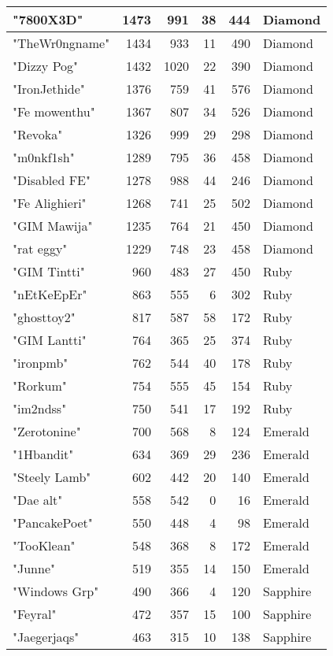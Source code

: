 \documentclass{article}
\begin{document}
\begin{table}[htbp]
\begin{tabular}{|l|r|r|r|r|l|}
"7800X3D" & 1473 & 991 & 38 & 444 & Diamond \\ \hline
"TheWr0ngname" & 1434 & 933 & 11 & 490 & Diamond \\ \hline
"Dizzy Pog" & 1432 & 1020 & 22 & 390 & Diamond \\ \hline
"IronJethide" & 1376 & 759 & 41 & 576 & Diamond \\ \hline
"Fe mowenthu" & 1367 & 807 & 34 & 526 & Diamond \\ \hline
"Revoka" & 1326 & 999 & 29 & 298 & Diamond \\ \hline
"m0nkf1sh" & 1289 & 795 & 36 & 458 & Diamond \\ \hline
"Disabled FE" & 1278 & 988 & 44 & 246 & Diamond \\ \hline
"Fe Alighieri" & 1268 & 741 & 25 & 502 & Diamond \\ \hline
"GIM Mawija" & 1235 & 764 & 21 & 450 & Diamond \\ \hline
"rat eggy" & 1229 & 748 & 23 & 458 & Diamond \\ \hline
"GIM Tintti" & 960 & 483 & 27 & 450 & Ruby \\ \hline
"nEtKeEpEr" & 863 & 555 & 6 & 302 & Ruby \\ \hline
"ghosttoy2" & 817 & 587 & 58 & 172 & Ruby \\ \hline
"GIM Lantti" & 764 & 365 & 25 & 374 & Ruby \\ \hline
"ironpmb" & 762 & 544 & 40 & 178 & Ruby \\ \hline
"Rorkum" & 754 & 555 & 45 & 154 & Ruby \\ \hline
"im2ndss" & 750 & 541 & 17 & 192 & Ruby \\ \hline
"Zerotonine" & 700 & 568 & 8 & 124 & Emerald \\ \hline
"1Hbandit" & 634 & 369 & 29 & 236 & Emerald \\ \hline
"Steely Lamb" & 602 & 442 & 20 & 140 & Emerald \\ \hline
"Dae alt" & 558 & 542 & 0 & 16 & Emerald \\ \hline
"PancakePoet" & 550 & 448 & 4 & 98 & Emerald \\ \hline
"TooKlean" & 548 & 368 & 8 & 172 & Emerald \\ \hline
"Junne" & 519 & 355 & 14 & 150 & Emerald \\ \hline
"Windows Grp" & 490 & 366 & 4 & 120 & Sapphire \\ \hline
"Feyral" & 472 & 357 & 15 & 100 & Sapphire \\ \hline
"Jaegerjaqs" & 463 & 315 & 10 & 138 & Sapphire \\ \hline

\end{tabular}
\end{table}
\end{document}
